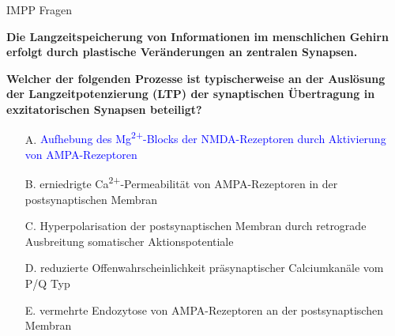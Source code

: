 \documentclass{beamer}
\begin{document}
\begin{frame}{IMPP Fragen}

\textbf{Die Langzeitspeicherung von Informationen im menschlichen Gehirn erfolgt durch plastische Veränderungen an zentralen Synapsen.}

\textbf{Welcher der folgenden Prozesse ist typischerweise an der Auslösung der Langzeitpotenzierung (LTP) der synaptischen Übertragung in exzitatorischen Synapsen beteiligt? } \\[0.2 cm]

\begin{itemize}
\item[A.] \textcolor{blue}{Aufhebung des Mg\textsuperscript{2+}-Blocks der NMDA-Rezeptoren durch Aktivierung von AMPA-Rezeptoren}
\item[B.] erniedrigte Ca\textsuperscript{2+}-Permeabilität von AMPA-Rezeptoren in der postsynaptischen Membran
\item[C.] Hyperpolarisation der postsynaptischen Membran durch retrograde Ausbreitung somatischer Aktionspotentiale
\item[D.] reduzierte Offenwahrscheinlichkeit präsynaptischer Calciumkanäle vom P/Q Typ
\item[E.] vermehrte Endozytose von AMPA-Rezeptoren an der postsynaptischen Membran

\end{itemize}

\end{frame}









\end{document}
